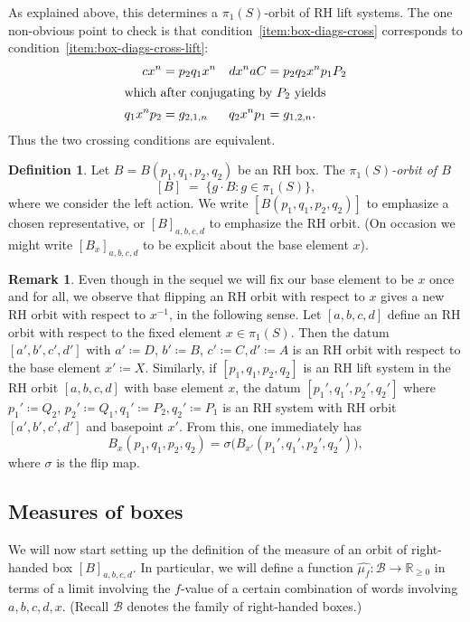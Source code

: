 \documentclass[11pt]{amsart}
\numberwithin{equation}{section}
\numberwithin{figure}{section}
\theoremstyle{definition}
\newtheorem{remark}[theorem]{Remark}
\newtheorem{definition}[theorem]{Definition}
\theoremstyle{plain}
\newcommand*{\wh}[1]{\widehat{#1}}
\begin{document}
As explained above, this determines a $\pi_1(S)$-orbit of RH lift systems.
The one non-obvious point to check is that
condition~\ref{item:box-diags-cross} corresponds
to condition~\ref{item:box-diags-cross-lift}:
\begin{align*}
  cx^n &= p_2 q_1 x^n& dx^naC &= p_2 q_2 x^n p_1 P_2\\
  \intertext{which after conjugating by $P_2$ yields}
  q_1 x^n p_2 &= g_{2,1,n} & q_2 x^n p_1 &= g_{1,2,n}.
\end{align*}
Thus the two crossing conditions are equivalent.

\begin{definition}
  Let $B = B(p_1,q_1,p_2,q_2)$ be an RH box. The \emph{$\pi_1(S)$-orbit of $B$}
  \[
    [B] \;=\; \{ g \cdot B \colon g \in \pi_1(S) \},
  \]
  where we consider the left action.
  We write $[B(p_1,q_1,p_2,q_2)]$ to emphasize a chosen representative, or $[B]_{a,b,c,d}$ to emphasize the RH orbit. (On occasion we might write $[B_x]_{a,b,c,d}$ to be explicit about the base element $x$).
\end{definition}

\begin{remark}\label{rmk:flip_rh_box}
Even though in the sequel we will fix our base element to be $x$ once and for all, we observe that flipping an RH orbit with respect to $x$ gives a new RH orbit with respect to $x^{-1}$, in the following sense.
Let $[a,b,c,d]$ define an RH orbit with respect to the fixed element $x \in \pi_1(S)$.
Then the datum $[a', b', c', d']$ with $a' \coloneqq D$, $b' \coloneqq B$, $c'\coloneqq C, d'\coloneqq A$ is an RH orbit with respect to the base element $x' \coloneqq X$. Similarly, if $[p_1,q_1,p_2,q_2]$ is an RH lift system in the RH orbit $[a,b,c,d]$ with base element $x$, the datum $[p_1',q_1',p_2',q_2']$
where $p_1' \coloneqq Q_2$, $p_2' \coloneqq Q_1, q_1' \coloneqq P_2, q_2' \coloneqq P_1$
is an RH system with RH orbit $[a',b',c',d']$ and basepoint $x'$.
From this, one immediately has
\[B_x(p_1,q_1,p_2,q_2)=\sigma\bigl(B_{x'}(p_1',q_1',p_2',q_2')\bigr),\]
where $\sigma$ is the flip map.
\end{remark}

\subsection{Measures of boxes}

We will now start setting up the definition of the measure of an orbit
of right-handed box $[B]_{a,b,c,d}$. In particular, we will define a function
$\wh{\mu_f} \colon \mathcal{B} \to \mathbb{R}_{\geq 0}$ in terms of a limit
involving the $f$-value of a certain combination of words involving
$a,b,c,d,x$. (Recall $\mathcal{B}$
denotes the family of right-handed boxes.)
\end{document}
